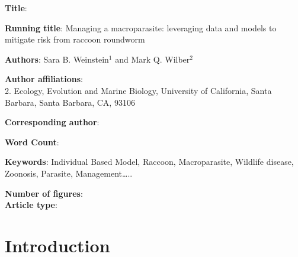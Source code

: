 \documentclass[11pt]{article}
\begin{document}
\noindent
\textbf{Title}{}: 

\bigskip

\noindent
\textbf{Running title}: Managing a macroparasite: leveraging data and models to mitigate risk from raccoon roundworm

\bigskip

\noindent
\textbf{Authors}:  Sara B. Weinstein$^1$ and Mark Q. Wilber$^2$

\bigskip

\noindent
\textbf{Author affiliations}: \\
2. Ecology, Evolution and Marine Biology, University of California, Santa Barbara, Santa Barbara, CA, 93106 \\

\bigskip

\noindent
\textbf{Corresponding author}:

\bigskip

\noindent
\textbf{Word Count}: 

\bigskip

\noindent
\textbf{Keywords}: Individual Based Model, Raccoon, Macroparasite,
Wildlife disease, Zoonosis, Parasite, Management\ldots{}..

\bigskip

\noindent
\textbf{Number of figures}:  \\
\textbf{Article type}: 

\clearpage

\section{Introduction}



\end{document}
